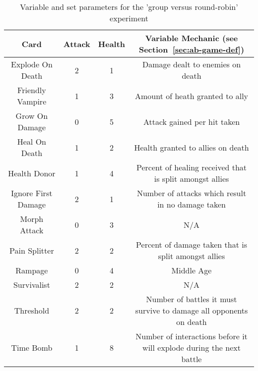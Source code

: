 \begin{table*}[t]
\centering
\begin{tabular}{||c c c c||} 
 \hline
 Card & Attack & Health & Variable Mechanic (see Section~\ref{sec:ab-game-def})\\ [0.5ex] 
 \hline\hline
 Explode On Death & 2 & 1 & Damage dealt to enemies on death \\ 
 \hline
 Friendly Vampire & 1 & 3 & Amount of heath granted to ally \\
 \hline
 Grow On Damage & 0 & 5 & Attack gained per hit taken \\
 \hline
 Heal On Death & 1 & 2 & Health granted to allies on death \\
 \hline
 Health Donor & 1 & 4 & Percent of healing received that is split amongst allies \\
 \hline
 Ignore First Damage & 2 & 1 & Number of attacks which result in no damage taken \\
 \hline
 Morph Attack & 0 & 3 & N/A \\
 \hline
 Pain Splitter & 2 & 2 & Percent of damage taken that is split amongst allies \\
 \hline
 Rampage & 0 & 4 & Middle Age  \\
 \hline
 Survivalist & 2 & 2 & N/A \\
 \hline
 Threshold & 2 & 2 & Number of battles it must survive to damage all opponents on death \\
 \hline
 Time Bomb & 1 & 8 & Number of interactions before it will explode during the next battle \\ 
 \hline
\end{tabular}
\caption{Variable and set parameters for the 'group versus round-robin' experiment}
\label{tab:group_vs_rr_params}
\end{table*}





